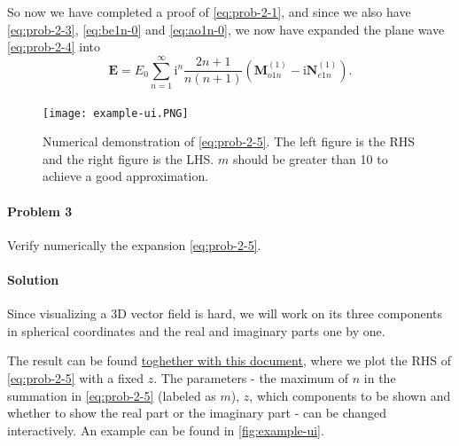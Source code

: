 \documentclass[hyperref, a4paper]{article}
\begin{document}
So now we have completed a proof of \eqref{eq:prob-2-1}, and since we also have \eqref{eq:prob-2-3}, \eqref{eq:be1n-0} and \eqref{eq:ao1n-0}, we now have expanded the plane wave \eqref{eq:prob-2-4} into 
\begin{equation}
    \boldsymbol{E}=E_{0} \sum_{n=1}^{\infty} \mathrm{i}^{n} \frac{2 n+1}{n(n+1)} \left( \boldsymbol{M}_{o 1 n}^{(1)}-\mathrm{i} \boldsymbol{N}_{e 1 n}^{(1)} \right).
    \label{eq:prob-2-5}
\end{equation}

\paragraph{}

\begin{figure}
    \centering
    \texttt{[image: example-ui.PNG]}
    \caption{Numerical demonstration of \eqref{eq:prob-2-5}. The left figure is the RHS and the right figure is the LHS. $m$ should be greater than 10 to achieve a good approximation.}
    \label{fig:example-ui}
\end{figure}

\paragraph{Problem 3} Verify numerically the expansion \eqref{eq:prob-2-5}. 

\paragraph{Solution} Since visualizing a 3D vector field is hard, we will work on its three components in spherical coordinates and the real and imaginary parts one by one.

The result can be found \href{./homework-1-numerical.nb}{toghether with this document}, where we plot the RHS of \eqref{eq:prob-2-5} with a fixed $z$.
The parameters - the maximum of $n$ in the summation in \eqref{eq:prob-2-5} (labeled as $m$), $z$, which components to be shown and whether to show the real part or the imaginary part - can be changed interactively.
An example can be found in \eqref{fig:example-ui}.
\end{document}

